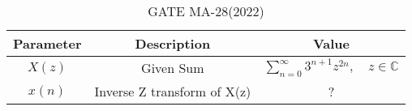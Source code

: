 
\begin{table}[h]
  \centering
  \begin{tabular}{|c|c|c|}
    \hline
Parameter & Description & Value \\ \hline
$X(z)$ & Given Sum & $\sum_{n=0}^{\infty} 3^{n+1}z^{2n}, \quad z \in \mathbb{C} $\\
\hline
$x(n)$ & Inverse Z transform of X(z) & ?\\
\hline
  \end{tabular}
  \vspace{2mm}
  \caption{GATE MA-28(2022)}
\end{table}




